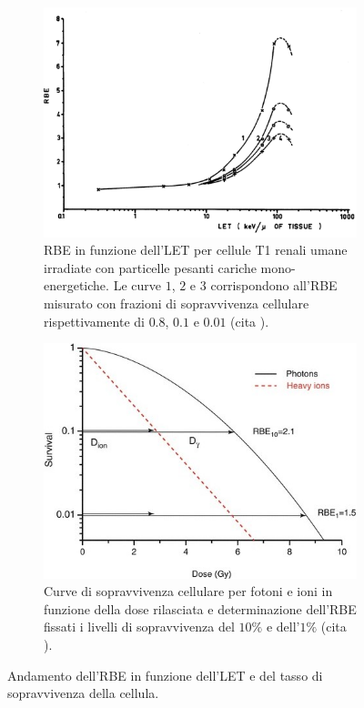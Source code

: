 \documentclass[12pt,a4paper,twoside]{report}
\begin{document}
	\begin{figure}[H]
		\centering
		\begin{subfigure}[t]{0.49\textwidth}
			\centering
 			\includegraphics[width=\textwidth, scale=0.5]{let_rbe1.png}
			\caption{RBE in funzione dell'LET per cellule T1 renali umane irradiate con particelle pesanti cariche mono-energetiche. Le curve $1$, $2$ e $3$ corrispondono all'RBE misurato con frazioni di sopravvivenza cellulare rispettivamente di $0.8$, $0.1$ e $0.01$ (cita
				).}
			\label{fig:let_rbe}
		\end{subfigure}
		\hfill
		\begin{subfigure}[t]{0.49\textwidth}
			\centering
			\includegraphics[width=\textwidth, scale=0.5]{survival_dose.jpg}
			\caption{Curve di sopravvivenza cellulare per fotoni e ioni in funzione della dose rilasciata e determinazione dell'RBE fissati i livelli di sopravvivenza del $10\%$ e dell'$1\%$ (cita
				).}
			\label{fig:survival_dose}
		\end{subfigure}
		\caption{Andamento dell'RBE in funzione dell'LET e del tasso di sopravvivenza della cellula.}
	\end{figure}
\end{document}
